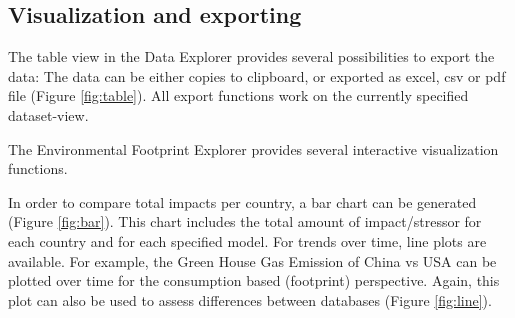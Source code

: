 \subsection{Visualization and exporting}

The table view in the Data Explorer provides several possibilities to export the data: The data can be either copies to clipboard, or exported as excel, csv or pdf file (Figure \ref{fig:table}). All export functions work on the currently specified dataset-view. 

The Environmental Footprint Explorer provides several interactive visualization functions. 

In order to compare total impacts per country, a bar chart can be generated (Figure \ref{fig:bar}). This chart includes the total amount of impact/stressor for each country and for each specified model. For trends over time, line plots are available. 
For example, the Green House Gas Emission of China vs USA can be plotted over time for the consumption based (footprint) perspective. Again, this plot can also be used to assess differences between databases (Figure \ref{fig:line}).

